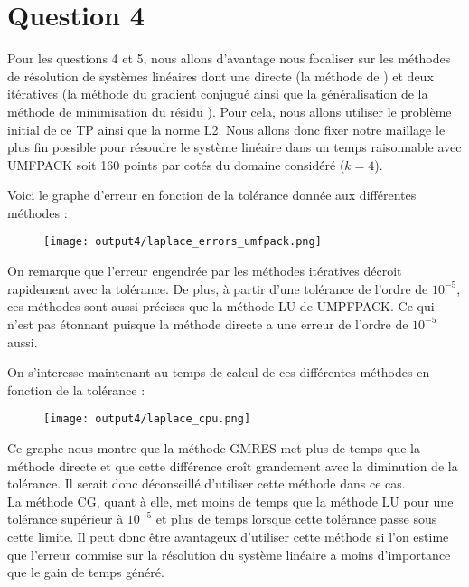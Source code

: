 \documentclass[11pt,a4paper]{report}
\begin{document}
			\section*{Question 4}
				
				Pour les questions 4 et 5, nous allons d'avantage nous focaliser sur les méthodes de résolution de systèmes linéaires dont une directe (la méthode  de ) et deux itératives (la méthode du gradient conjugué  ainsi que la généralisation de la méthode de minimisation du résidu ). 
				Pour cela, nous allons utiliser le problème initial de ce TP ainsi que la norme L2. Nous allons donc fixer notre maillage le plus fin possible pour résoudre le système linéaire dans un temps raisonnable avec UMFPACK soit 160 points par cotés du domaine considéré ($k = 4$). 
				
				
				Voici le graphe d'erreur en fonction de la tolérance donnée aux différentes méthodes :
											
				\begin{figure}[H]
					\centering
					\texttt{[image: output4/laplace\_errors\_umfpack.png]}				
				\end{figure}

				On remarque que l'erreur engendrée par les méthodes itératives décroit rapidement avec la tolérance. De plus, à partir d'une tolérance de l'ordre de $10^{-5}$, ces méthodes sont aussi précises que la méthode LU de UMPFPACK. Ce qui n'est pas étonnant puisque la méthode directe a une erreur de l'ordre de $10^{-5}$ aussi.
				
				On s'interesse maintenant au temps de calcul de ces différentes méthodes en fonction de la tolérance :

				\begin{figure}[H]
					\centering
					\texttt{[image: output4/laplace\_cpu.png]}				
				\end{figure}
				
				Ce graphe nous montre que la méthode GMRES met plus de temps que la méthode directe et que cette différence croît grandement avec la diminution de la tolérance. Il serait donc déconseillé d'utiliser cette méthode dans ce cas.\\
				La méthode CG, quant à elle, met moins de temps que la méthode LU pour une tolérance supérieur à $10^{-5}$ et plus de temps lorsque cette tolérance passe sous cette limite. Il peut donc être avantageux d'utiliser cette méthode si l'on estime que l'erreur commise sur la résolution du système linéaire a moins d'importance que le gain de temps généré.
			
\end{document}
